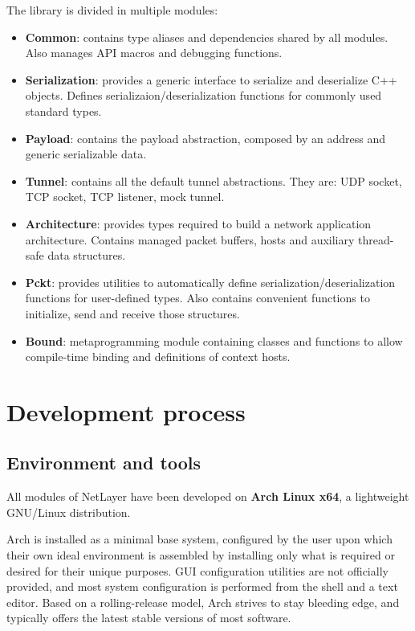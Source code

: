 \documentclass[12pt]{report}
\newcommand{\+}{\discretionary{\mbox{\scriptsize$\hookleftarrow$}}{}{}}
\renewcommand\emph{\textbf}
\begin{document}
        The library is divided in multiple modules:
        \begin{itemize}
            \item \emph{Common}: contains type aliases and dependencies shared by all modules. Also manages API macros and debugging functions.
            \item \emph{Serialization}: provides a generic interface to serialize and deserialize C++ objects. Defines serializaion/deserialization functions for commonly used standard types.
            \item \emph{Payload}: contains the payload abstraction, composed by an address and generic serializable data.
            \item \emph{Tunnel}: contains all the default tunnel abstractions. They are: UDP socket, TCP socket, TCP listener, mock tunnel.
            \item \emph{Architecture}: provides types required to build a network application architecture. Contains managed packet buffers, hosts and auxiliary thread-safe data structures. 
            \item \emph{Pckt}: provides utilities to automatically define serialization/deserialization functions for user-defined types. Also contains convenient functions to initialize, send and receive those structures.
            \item \emph{Bound}: metaprogramming module containing classes and functions to allow compile-time binding and definitions of context hosts.
        \end{itemize}

        \chapter{Development process}

            \section{Environment and tools}
                All modules of NetLayer have been developed on \emph{Arch Linux x64}, a lightweight GNU/Linux distribution.

                Arch is installed as a minimal base system, configured by the user upon which their own ideal environment is assembled by installing only what is required or desired for their unique purposes. GUI configuration utilities are not officially provided, and most system configuration is performed from the shell and a text editor. Based on a rolling-release model, Arch strives to stay bleeding edge, and typically offers the latest stable versions of most software.
\end{document}
